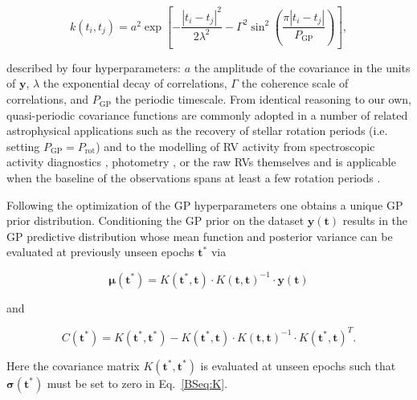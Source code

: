 \begin{equation}
k(t_i,t_j) = a^2 \exp{\left[ - \frac{|t_i-t_j|^2}{2\lambda^2} -\Gamma^2
    \sin^2{\left(\frac{\pi|t_i-t_j|}{P_{\text{GP}}} \right)} \right]}, \label{cov}
\end{equation}

\noindent described by four hyperparameters: $a$ the amplitude of the covariance in the units of $\mathbf{y}$,
$\lambda$ the exponential decay of correlations, $\Gamma$ the coherence scale of correlations,
and $P_{\text{GP}}$ the periodic timescale. 
From identical reasoning to our own, quasi-periodic covariance functions are commonly adopted in a
number of related astrophysical applications such as the recovery of stellar rotation periods (i.e.
setting $P_{\text{GP}}=P_{\text{rot}}$) \citep[e.g.][]{angus17} and to the modelling of RV activity
from spectroscopic activity diagnostics \citep[e.g.][]{haywood14, rajpaul15, cloutier17b}, 
photometry \citep[e.g.][]{cloutier17a, cloutier17b}, or the raw RVs themselves
\citep[e.g.][]{faria16, donati17, yu17} and is applicable when the baseline of the
observations spans at least a few rotation periods \citep{pont13}.

Following the optimization of the GP hyperparameters one obtains a unique GP prior distribution. Conditioning
the GP prior on the dataset $\mathbf{y}(\mathbf{t})$ results in the GP predictive distribution whose mean function
and posterior variance can be evaluated at previously unseen epochs $\mathbf{t}^*$ via

\begin{equation}
  \boldsymbol{\mu}(\mathbf{t}^*) = K(\mathbf{t}^*,\mathbf{t}) \cdot K(\mathbf{t},\mathbf{t})^{-1} \cdot \mathbf{y}(\mathbf{t})
  \label{BSeq:GPmean}
\end{equation}

\noindent and 

\begin{equation}
  C(\mathbf{t}^*) = K(\mathbf{t}^*,\mathbf{t}^*) - K(\mathbf{t}^*,\mathbf{t}) \cdot K(\mathbf{t},\mathbf{t})^{-1} \cdot
  K(\mathbf{t}^*,\mathbf{t})^T.
  \label{BSeq:GPvar}
\end{equation}

\noindent Here the covariance matrix $K(\mathbf{t}^*,\mathbf{t}^*)$ is evaluated at unseen epochs such that
$\boldsymbol{\sigma}(\mathbf{t}^*)$ must be set to zero in Eq.~\ref{BSeq:K}.


